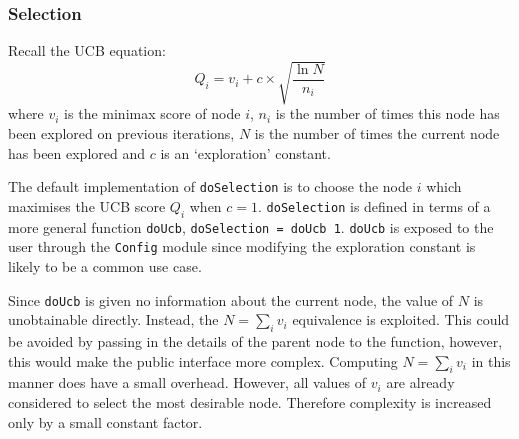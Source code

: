 \subsubsection{Selection}
Recall the {UCB} equation:
\begin{equation}
Q_{i} = v_{i}+c\times\sqrt{\frac{\ln{N}}{n_{i}}}
\nonumber
\end{equation}
where $v_{i}$ is the {minimax} score of node $i$, $n_{i}$ is the number of times this node has been explored on previous iterations, $N$ is the number of times the current node has been explored and $c$ is an `exploration' constant.

The default implementation of \texttt{doSelection} is to choose the node $i$ which maximises the {UCB} score $Q_{i}$ when $c=1$. \verb|doSelection| is defined in terms of a more general function \verb|doUcb|, \verb|doSelection = doUcb 1|. \verb|doUcb| is exposed to the user through the \verb|Config| module since modifying the exploration constant is likely to be a common use case.

Since \verb|doUcb| is given no information about the current node, the value of $N$ is unobtainable directly. Instead, the $N=\sum_{i}v_{i}$ equivalence is exploited. This could be avoided by passing in the details of the parent node to the function, however, this would make the public interface more complex. Computing $N=\sum_{i}v_{i}$ in this manner does have a small overhead. However, all values of $v_{i}$ are already considered to select the most desirable node. Therefore complexity is increased only by a small constant factor.

